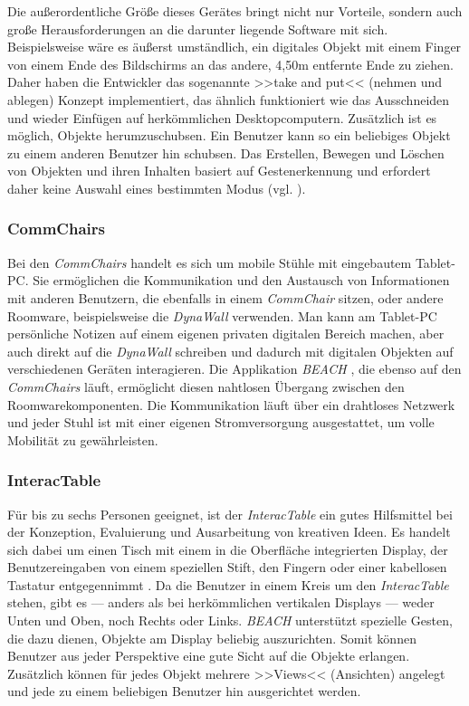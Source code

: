 Die außerordentliche Größe dieses Gerätes bringt nicht nur Vorteile, sondern auch große Herausforderungen an die darunter liegende Software mit sich. Beispielsweise wäre es äußerst umständlich, ein digitales Objekt mit einem Finger von einem Ende des Bildschirms an das andere, 4,50m entfernte Ende zu ziehen. Daher haben die Entwickler das sogenannte >>take and put<< (nehmen und ablegen) Konzept implementiert, das ähnlich funktioniert wie das Ausschneiden und wieder Einfügen auf herkömmlichen Desktopcomputern. Zusätzlich ist es möglich, Objekte herumzuschubsen. Ein Benutzer kann so ein beliebiges Objekt zu einem anderen Benutzer hin schubsen. Das Erstellen, Bewegen und Löschen von Objekten und ihren Inhalten basiert auf Gestenerkennung und erfordert daher keine Auswahl eines bestimmten Modus (vgl. ).

\subsubsection{CommChairs}

Bei den \emph{CommChairs} handelt es sich um mobile Stühle mit eingebautem Tablet-PC. Sie ermöglichen die Kommunikation und den Austausch von Informationen mit anderen Benutzern, die ebenfalls in einem \emph{CommChair} sitzen, oder andere Roomware, beispielsweise die \emph{DynaWall} verwenden. Man kann am Tablet-PC persönliche Notizen auf einem eigenen privaten digitalen Bereich machen, aber auch direkt auf die \emph{DynaWall} schreiben und dadurch mit digitalen Objekten auf verschiedenen Geräten interagieren. Die Applikation \emph{BEACH} \citep{Tandler:2000p238}, die ebenso auf den \emph{CommChairs} läuft, ermöglicht diesen nahtlosen Übergang zwischen den Roomwarekomponenten. Die Kommunikation läuft über ein drahtloses Netzwerk und jeder Stuhl ist mit einer eigenen Stromversorgung ausgestattet, um volle Mobilität zu gewährleisten.

\subsubsection{InteracTable}

Für bis zu sechs Personen geeignet, ist der \emph{InteracTable} ein gutes Hilfsmittel bei der Konzeption, Evaluierung und Ausarbeitung von kreativen Ideen. Es handelt sich dabei um einen Tisch mit einem in die Oberfläche integrierten Display, der Benutzereingaben von einem speziellen Stift, den Fingern oder einer kabellosen Tastatur entgegennimmt \citep{Streitz:2001p213}. Da die Benutzer in einem Kreis um den \emph{InteracTable} stehen, gibt es — anders als bei herkömmlichen vertikalen Displays — weder Unten und Oben, noch Rechts oder Links. \emph{BEACH} unterstützt spezielle Gesten, die dazu dienen, Objekte am Display beliebig auszurichten. Somit können Benutzer aus jeder Perspektive eine gute Sicht auf die Objekte erlangen. Zusätzlich können für jedes Objekt mehrere >>Views<< (Ansichten) angelegt und jede zu einem beliebigen Benutzer hin ausgerichtet werden. 

